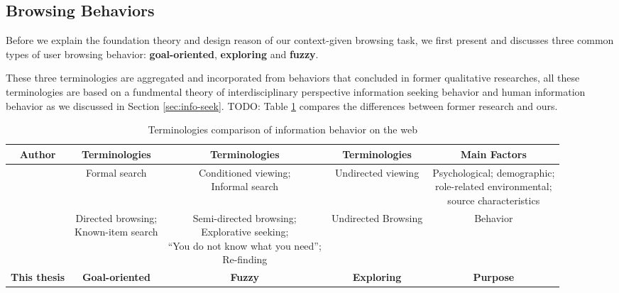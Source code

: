 


\subsection{Browsing Behaviors}
\label{sec:behavior}

Before we explain the foundation theory and design reason of our context-given browsing task, 
we first present and discusses three common types of user browsing behavior: \textbf{goal-oriented}, 
\textbf{exploring} and \textbf{fuzzy}.

These three terminologies are aggregated and incorporated from behaviors that concluded in former 
qualitative researches, all these terminologies are based on a fundmental theory of 
interdisciplinary perspective information seeking behavior and human information behavior\cite{wilson1997information} 
as we discussed in Section \ref{sec:info-seek}. TODO:
Table \ref{table:info-seek} compares the differences between former research and ours.

\begin{table}[H]
    \small
    \centering
    \caption{Terminologies comparison of information behavior on the web}
    \begin{adjustbox}{width=\textwidth}
        \begin{tabular}{ccccc}
            \toprule
            \textbf{Author} & \textbf{Terminologies} & \textbf{Terminologies} & \textbf{Terminologies} & \textbf{Main Factors} \\
            \hline
            \cite{choo1999information} & Formal search & \makecell{Conditioned viewing; \\ Informal search} & Undirected viewing & \makecell{Psychological; demographic;\\ role-related environmental; \\source characteristics} \\
            \cite{johnson2017patterns} & \makecell{Directed browsing; \\Known-item search} & \makecell{Semi-directed browsing; \\Explorative seeking; \\``You do not know what you need''; \\Re-finding} & Undirected Browsing & Behavior \\
            \textbf{This thesis} & \textbf{Goal-oriented} & \textbf{Fuzzy} & \textbf{Exploring} & \textbf{Purpose} \\
            \bottomrule
        \end{tabular}
        \label{table:info-seek}
    \end{adjustbox}
\end{table}

